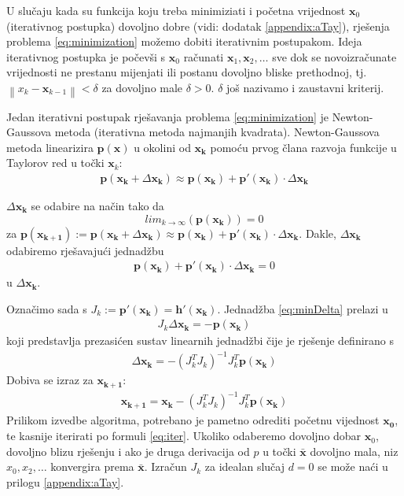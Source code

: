 \documentclass[a4paper,twoside,12pt]{memoir} %
\begin{document}
U slučaju kada su funkcija koju treba minimiziati i početna vrijednost $\mathbf{x}_0$
(iterativnog postupka) dovoljno dobre (vidi: dodatak \ref{appendix:aTay}), rješenja problema \ref{eq:minimization} možemo
dobiti iterativnim postupakom.
Ideja iterativnog postupka je počevši s $\mathbf{x}_0$ računati $\mathbf{x}_1, \mathbf{x}_2, \hdots $ sve dok se novoizračunate vrijednosti ne prestanu mijenjati ili postanu dovoljno bliske prethodnoj, tj.
$\left \| x_{k} - \mathbf{x}_{k-1}\right\| < \delta$ za dovoljno male $\delta > 0$.
$\delta$ još nazivamo i zaustavni kriterij.

Jedan iterativni postupak rješavanja problema \ref{eq:minimization} je Newton-Gaussova metoda (iterativna metoda najmanjih kvadrata).
Newton-Gaussova metoda linearizira $\mathbf{p}(\mathbf{x})$ u okolini od $\mathbf{x_k}$ pomoću prvog člana razvoja funkcije u Taylorov red\label{stranica:NGLin} u točki $\mathbf{x}_k$:
\begin{align}\label{eq:approx}
	\mathbf{p}(\mathbf{x_k}+ \Delta \mathbf{x_k}) \approx \mathbf{p}(\mathbf{x_k}) + \mathbf{p}'(\mathbf{ x_k})\cdot \Delta \mathbf{x_k}
\end{align}

$\Delta \mathbf{x_k}$ se odabire na način tako da
$$lim_{k \to \infty} \left( \mathbf{p}(\mathbf{x_k}) \right) = 0$$ za $\mathbf{p}(\mathbf{x_{k+1}}) := \mathbf{p}(\mathbf{x_k}+ \Delta \mathbf{x_k}) \approx \mathbf{p}(\mathbf{x_k}) + \mathbf{p}'(\mathbf{x_k})\cdot \Delta \mathbf{x_k}$.
Dakle, $ \Delta \mathbf{x_k} $ odabiremo rješavajući jednadžbu
\begin{align}\label{eq:minDelta}
	\mathbf{p}(\mathbf{x_k}) + \mathbf{p}'(\mathbf{x_k})\cdot \Delta \mathbf{x_k} = 0
\end{align}
u $\Delta \mathbf{x_k}$.

Označimo sada s $J_k := \mathbf{p}'(\mathbf{x_k}) = \mathbf{h}'(\mathbf{x_k})$.
Jednadžba \ref{eq:minDelta} prelazi u 
\begin{align}\label{eq:minDelta2}
	J_k \Delta \mathbf{x_k} = -\mathbf{p}(\mathbf{x_k})
\end{align}
koji predstavlja prezasićen sustav linearnih jednadžbi čije je
rješenje definirano s  
\begin{align}\label{eq:minDeltaRj}
\Delta \mathbf{x_k} = - (J_k^TJ_k)^{-1}J_k^T \mathbf{p}(\mathbf{x_k})
\end{align}
Dobiva se izraz za $\mathbf{x_{k+1}}$:
\begin{align}\label{eq:iter}
	\mathbf{x_{k+1}} = \mathbf{x_{k}} - (J_k^TJ_k)^{-1}J_k^T \mathbf{p}(\mathbf{x_k})
\end{align}
Prilikom izvedbe algoritma, potrebano je pametno odrediti početnu vijednost $\mathbf{x_0}$, te kasnije iterirati po formuli \ref{eq:iter}.
Ukoliko odaberemo dovoljno dobar $\mathbf{x}_0$, dovoljno blizu rješenju i
ako je druga derivacija od $p$ u točki $\bar{\mathbf{x}}$ dovoljno mala,
niz $x_0,x_2, \hdots$ konvergira prema $\bar{\mathbf{x}}$. Izračun $J_k$ za idealan slučaj $d = 0$ se može naći u prilogu \ref{appendix:aTay}.
\end{document}
